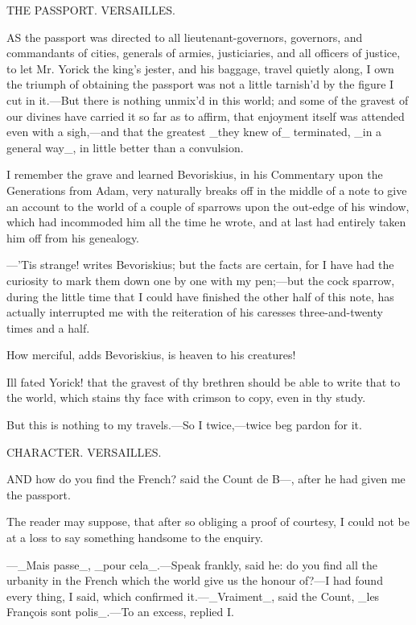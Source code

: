 \documentclass[twoside]{article}
\begin{document}
THE PASSPORT.
VERSAILLES.


AS the passport was directed to all lieutenant-governors, governors, and
commandants of cities, generals of armies, justiciaries, and all officers
of justice, to let Mr. Yorick the king’s jester, and his baggage, travel
quietly along, I own the triumph of obtaining the passport was not a
little tarnish’d by the figure I cut in it.—But there is nothing unmix’d
in this world; and some of the gravest of our divines have carried it so
far as to affirm, that enjoyment itself was attended even with a
sigh,—and that the greatest _they knew of_ terminated, _in a general
way_, in little better than a convulsion.

I remember the grave and learned Bevoriskius, in his Commentary upon the
Generations from Adam, very naturally breaks off in the middle of a note
to give an account to the world of a couple of sparrows upon the out-edge
of his window, which had incommoded him all the time he wrote, and at
last had entirely taken him off from his genealogy.

—’Tis strange! writes Bevoriskius; but the facts are certain, for I have
had the curiosity to mark them down one by one with my pen;—but the cock
sparrow, during the little time that I could have finished the other half
of this note, has actually interrupted me with the reiteration of his
caresses three-and-twenty times and a half.

How merciful, adds Bevoriskius, is heaven to his creatures!

Ill fated Yorick! that the gravest of thy brethren should be able to
write that to the world, which stains thy face with crimson to copy, even
in thy study.

But this is nothing to my travels.—So I twice,—twice beg pardon for it.




CHARACTER.
VERSAILLES.


AND how do you find the French? said the Count de B—, after he had given
me the passport.

The reader may suppose, that after so obliging a proof of courtesy, I
could not be at a loss to say something handsome to the enquiry.

—_Mais passe_, _pour cela_.—Speak frankly, said he: do you find all the
urbanity in the French which the world give us the honour of?—I had found
every thing, I said, which confirmed it.—_Vraiment_, said the Count, _les
François sont polis_.—To an excess, replied I.
\end{document}
